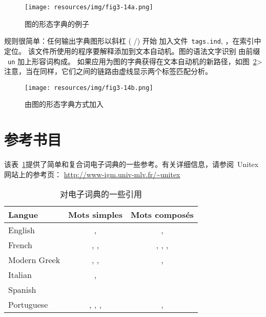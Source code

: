 \begin{figure}[!ht]
\begin{center}
\texttt{[image: resources/img/fig3-14a.png]}
\caption{图的形态字典的例子\label{morphoA}}
\end{center}
\end{figure}

\noindent 规则很简单：任何输出字典图形以斜杠 ( /) 开始
加入文件\ \verb+tags.ind+, ，在索引中定位。
该文件所使用的程序要解释添加到文本自动机。图的语法文字识别
由前缀 \ \verb+un+ 加上形容词构成。 如果应用为图的字典获得在文本自动机的新路径，如图\
\ref{morphoB}> 注意，当在同样，它们之间的链路由虚线显示两个标签匹配分析。

\begin{figure}[!ht]
\begin{center}
\texttt{[image: resources/img/fig3-14b.png]}
\caption{由图的形态字典方式加入\ \label{morphoB}}
\end{center}
\end{figure}

\section{参考书目}

该表~\ref{ref-dicos}提供了简单和复合词电子词典的一些参考。有关详细信息，请参阅\ Unitex 网站上的参考页： \url{http://www-igm.univ-mlv.fr/~unitex}

\bigskip
\begin{table}[!h]
\begin{center}
\begin{tabular}{|l|c|c|}
\hline
\textbf{Langue} & \textbf{Mots simples} & \textbf{Mots composés} \\
\hline
English & \cite{klarsfeld}, \cite{monceaux-1995} & \cite{delac-anglais},
\cite{these-Savary} \\
\hline
French & \cite{formes-ambigues}, \cite{dicos-francais}, \cite{jacques-1995} & \cite{dicos-francais},
\cite{Gross96},
\cite{max-1993},
\cite{syntaxe-de-ladverbe} \\
\hline
Modern Greek & \cite{modern-greek}, \cite{matthieu-anastasia}, \cite{these-tita} & \cite{tita-2002},
\cite{anastasia-2002} \\
\hline
Italian & \cite{delaf-italien}, \cite{delaf-italien-book} & \cite{composes-italien} \\
\hline
Spanish & \cite{blanco-2000} & \cite{blanco-1997} \\
\hline
Portuguese & \cite{eleuterio1995}, \cite{ranchhod1996b}, \cite{ranchhodd1998},
\cite{muniz2005} & \cite{ranchhod1991}, \cite{ranchhodd1998} \\
\hline
\end{tabular}
\caption{对电子词典的一些引用\label{ref-dicos}}
\end{center}
\end{table}

